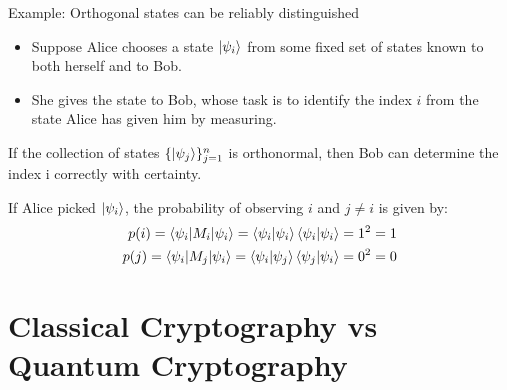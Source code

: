 \documentclass[handout, 10 pt]{beamer}
\begin{document}
\begin{frame}{Example: Orthogonal states can be reliably distinguished}
\begin{block}{}
\begin{itemize}
    \item Suppose Alice chooses a state $\ket{\psi_i}$ from some fixed set of states known to both herself and to Bob.
    \pause
    \item She gives the state to Bob, whose task is to identify the index $i$ from the state Alice has given him by measuring.
\end{itemize}
\end{block}
\pause

If the collection of states $\{\ket{\psi_j}\}_{j=1}^n$ is orthonormal, then Bob can determine the index i correctly with certainty.
\pause
\bigskip

If Alice picked $\ket{\psi_i}$, the probability of observing $i$ and $j\neq i$ is given by:
\begin{align}
p(i)=\braket{\psi_i | M_i |\psi_i}=\braket{\psi_i |\psi_i}\braket{\psi_i |\psi_i}=1^2=1\\
p(j)=\braket{\psi_i | M_j |\psi_i}=\braket{\psi_i |\psi_j}\braket{\psi_j |\psi_i}=0^2=0
\end{align}
\end{frame}


\section{Classical Cryptography vs Quantum Cryptography}
\end{document}
